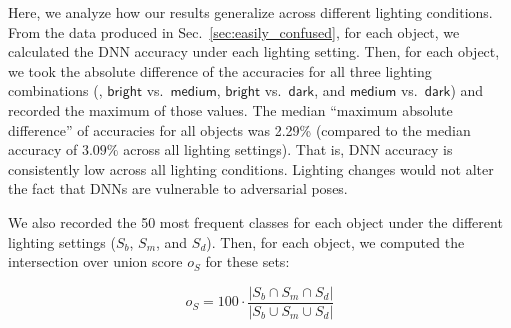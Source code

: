 \documentclass[10pt,twocolumn,letterpaper]{article}
\newcommand{\subsec}[1]{\noindent{\textbf{#1.}}}
\newcommand{\bright}{\ensuremath{\mathsf{bright}}\xspace}
\newcommand{\medium}{\ensuremath{\mathsf{medium}}\xspace}
\newcommand{\dark}{\ensuremath{\mathsf{dark}}\xspace}
\begin{document}


Here, we analyze how our results generalize across different lighting conditions.
From the data produced in Sec.~\ref{sec:easily_confused}, for each object, we calculated the
DNN accuracy under each lighting setting.
Then, for each object, we took the absolute difference of the accuracies for all three lighting combinations (\ie, \bright vs.~\medium, \bright vs.~\dark, and \medium vs.~\dark) and recorded the maximum of those values.
The median ``maximum absolute difference'' of accuracies for all objects was 2.29\% (compared to the median accuracy of $3.09\%$ across all lighting settings).
That is, DNN accuracy is consistently low across all lighting conditions.
Lighting changes would not alter the fact that DNNs are vulnerable to adversarial poses.

We also recorded the 50 most frequent classes for each object under the different lighting settings ($S_{b}$, $S_{m}$, and $S_{d}$).
Then, for each object, we computed the intersection over union score $o_{S}$ for these sets:

\vspace*{-0.3cm}
\begin{equation}
o_{S} = 100 \cdot \frac{|S_{b} \cap S_{m} \cap S_{d}|}{|  S_{b} \cup S_{m} \cup S_{d} |}
\end{equation}

%
%
%
%
\end{document}
